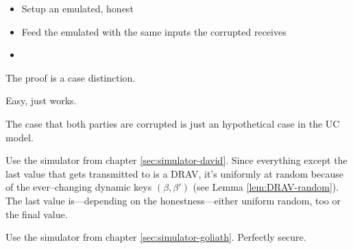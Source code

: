 \label{sec:simulator-goliath}

\begin{itemize}

  \item Setup an emulated, honest \JWpOne{}

  \item Feed the emulated \JWpOne{} with the same inputs the corrupted \JWpOne{}
    receives

  \item

\end{itemize}


%
%
\label{sec:proof}

The proof is a case distinction.



Easy, just works.




The case that both parties are corrupted is just an hypothetical case in the UC
model.



Use the simulator from chapter \ref{sec:simulator-david}. Since everything
except the last value that gets transmitted to \JWpTwo{} is a DRAV, it's
uniformly at random because of the ever--changing dynamic keys $(\beta, \beta')$
(see Lemma \ref{lem:DRAV-random}). The last value is---depending on the
honestness---either uniform random, too or the final value.



Use the simulator from chapter \ref{sec:simulator-goliath}. Perfectly secure.

